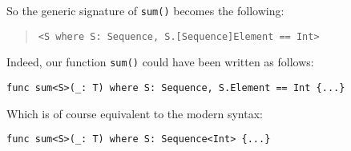 \documentclass[../generics]{subfiles}
\begin{document}
\begin{example}
\begin{quote}
\begin{tabular}{lll}
\bottomrule
\end{tabular}
\end{quote}
So the generic signature of \texttt{sum()} becomes the following:
\begin{quote}
\begin{verbatim}
<S where S: Sequence, S.[Sequence]Element == Int>
\end{verbatim}
\end{quote}
Indeed, our function \texttt{sum()} could have been written as follows:
\begin{Verbatim}
func sum<S>(_: T) where S: Sequence, S.Element == Int {...}
\end{Verbatim}
Which is of course equivalent to the modern syntax:
\begin{Verbatim}
func sum<S>(_: T) where S: Sequence<Int> {...}
\end{Verbatim}
\end{example}
\end{document}
